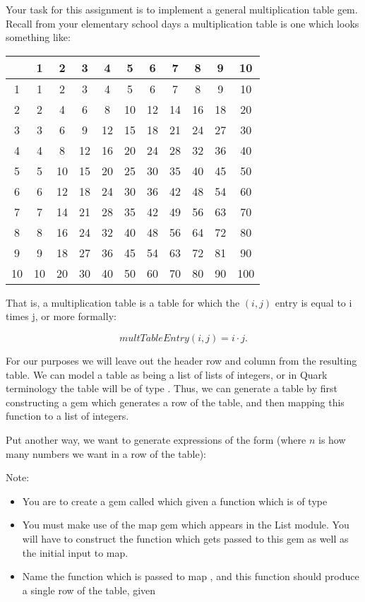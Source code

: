 	{
		Your task for this assignment is to implement a general multiplication table gem.  Recall from your elementary school days a multiplication table is one which looks something like:
		\begin{center}
		\begin{tabular}{c|cccccccccc}
			\ & 1 & 2 & 3 & 4 & 5 & 6 & 7 & 8 & 9 & 10 \\\hline
			1 & 1 & 2 & 3 & 4 & 5 & 6 & 7 & 8 & 9 & 10 \\
			2 & 2 & 4 & 6 & 8 & 10 & 12 & 14 & 16 & 18 & 20 \\
			3 & 3 & 6 & 9 & 12 & 15 & 18 & 21 & 24 & 27 & 30 \\
			4 & 4 & 8 & 12 & 16 & 20 & 24 & 28 & 32 & 36 & 40 \\
			5 & 5 & 10 & 15 & 20 & 25 & 30 & 35 & 40 & 45 & 50 \\
			6 & 6 & 12 & 18 & 24 & 30 & 36 & 42 & 48 & 54 & 60 \\
			7 & 7 & 14 & 21 & 28 & 35 & 42 & 49 & 56 & 63 & 70 \\
			8 & 8 & 16 & 24 & 32 & 40 & 48 & 56 & 64 & 72 & 80 \\
			9 & 9 & 18 & 27 & 36 & 45 & 54 & 63 & 72 & 81 & 90 \\
			10 & 10 & 20 & 30 & 40 & 50 & 60 & 70 & 80 & 90 & 100 \\
		\end{tabular}
		\end{center}
		
		That is, a multiplication table is a table for which the \((i,j)\) entry is equal to i times j, or more formally:
		
$$
multTableEntry\left(i,j\right) = i \cdot j.
$$

		For our purposes we will leave out the header row and column from the resulting table.  We can model a table as being a list of lists of integers, or in Quark terminology the table will be of type \code{[[Int]]}.  Thus, we can generate a table by first constructing a gem which generates a row of the table, and then mapping this function to a list of integers.
		
		Put another way, we want to generate expressions of the form (where $n$ is how many numbers we want in a row of the table):
		
		
		Note:
		
		\begin{itemize}
			\item You are to create a gem called  which given a function which is of type 
			\item You must make use of the map gem which appears in the List module.  You will have to construct the function which gets passed to this gem as well as the initial input to map.
			\item Name the function which is passed to map , and this function should produce a single row of the table, given 
		\end{itemize}
	}
